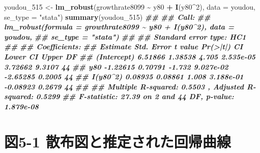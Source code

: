 \documentclass[
]{book}
\newenvironment{Shaded}{\begin{snugshade}}{\end{snugshade}}
\newcommand{\AttributeTok}[1]{\textcolor[rgb]{0.13,0.29,0.53}{#1}}
\newcommand{\DecValTok}[1]{\textcolor[rgb]{0.00,0.00,0.81}{#1}}
\newcommand{\DocumentationTok}[1]{\textcolor[rgb]{0.56,0.35,0.01}{\textbf{\textit{#1}}}}
\newcommand{\FunctionTok}[1]{\textcolor[rgb]{0.13,0.29,0.53}{\textbf{#1}}}
\newcommand{\NormalTok}[1]{#1}
\newcommand{\OtherTok}[1]{\textcolor[rgb]{0.56,0.35,0.01}{#1}}
\newcommand{\SpecialCharTok}[1]{\textcolor[rgb]{0.81,0.36,0.00}{\textbf{#1}}}
\newcommand{\StringTok}[1]{\textcolor[rgb]{0.31,0.60,0.02}{#1}}
\begin{document}
\begin{Shaded}
\begin{Highlighting}[]
\NormalTok{youdou\_515 }\OtherTok{\textless{}{-}} \FunctionTok{lm\_robust}\NormalTok{(growthrate8099 }\SpecialCharTok{\textasciitilde{}}\NormalTok{ y80 }\SpecialCharTok{+} \FunctionTok{I}\NormalTok{(y80}\SpecialCharTok{\^{}}\DecValTok{2}\NormalTok{), }\AttributeTok{data =}\NormalTok{ youdou, }\AttributeTok{se\_type =} \StringTok{"stata"}\NormalTok{)}
\FunctionTok{summary}\NormalTok{(youdou\_515)}
\DocumentationTok{\#\# }
\DocumentationTok{\#\# Call:}
\DocumentationTok{\#\# lm\_robust(formula = growthrate8099 \textasciitilde{} y80 + I(y80\^{}2), data = youdou, }
\DocumentationTok{\#\#     se\_type = "stata")}
\DocumentationTok{\#\# }
\DocumentationTok{\#\# Standard error type:  HC1 }
\DocumentationTok{\#\# }
\DocumentationTok{\#\# Coefficients:}
\DocumentationTok{\#\#             Estimate Std. Error t value  Pr(\textgreater{}|t|) CI Lower CI Upper DF}
\DocumentationTok{\#\# (Intercept)  6.51866    1.38538   4.705 2.535e{-}05  3.72662   9.3107 44}
\DocumentationTok{\#\# y80         {-}1.22615    0.70791  {-}1.732 9.027e{-}02 {-}2.65285   0.2005 44}
\DocumentationTok{\#\# I(y80\^{}2)     0.08935    0.08861   1.008 3.188e{-}01 {-}0.08923   0.2679 44}
\DocumentationTok{\#\# }
\DocumentationTok{\#\# Multiple R{-}squared:  0.5503 ,    Adjusted R{-}squared:  0.5299 }
\DocumentationTok{\#\# F{-}statistic: 27.39 on 2 and 44 DF,  p{-}value: 1.879e{-}08}
\end{Highlighting}
\end{Shaded}

\hypertarget{ux56f35-1-ux6563ux5e03ux56f3ux3068ux63a8ux5b9aux3055ux308cux305fux56deux5e30ux66f2ux7dda}{%
\section*{図5-1 散布図と推定された回帰曲線}\label{ux56f35-1-ux6563ux5e03ux56f3ux3068ux63a8ux5b9aux3055ux308cux305fux56deux5e30ux66f2ux7dda}}
\end{document}
